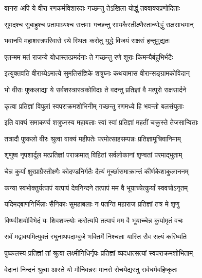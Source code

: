\twolineshloka
{वानरा अपि ये वीरा रणकर्मविशारदाः}
{गच्छन्तु तेऽखिला योद्धुं तववाक्यप्रणोदिताः}%

\twolineshloka
{सुमदश्च सुबाहुश्च प्रतापाग्र्यश्च सत्तमाः}
{गच्छन्तु सायकैस्तीक्ष्णैस्तान्योद्धुं राक्षसाधमान्}%

\twolineshloka
{भवानपि महाशस्त्रपरिवारो रथे स्थितः}
{करोतु युद्धे विजयं राक्षसं हन्तुमुद्यतः}%

\twolineshloka
{एतन्मम मतं राजन्ये योधास्तत्प्रमर्दनाः}
{ते गच्छन्तु रणे शूराः किमन्यैर्बहुभिर्भटैः}%

\twolineshloka
{इत्युक्तवति वीराग्र्येऽमात्ये सुमतिसंज्ञिके}
{शत्रुघ्नः कथयामास वीरान्सङ्ग्रामकोविदान्}%

\twolineshloka
{भो वीराः पुष्कलाद्या ये सर्वशस्त्रास्त्रकोविदाः}
{ते वदन्तु प्रतिज्ञां वै मत्पुरो राक्षसार्दने}%

\twolineshloka
{कृत्वा प्रतिज्ञां विपुलां स्वपराक्रमशोभिनीम्}
{गच्छन्तु रणमध्ये हि भवन्तो बलसंयुताः}%

\twolineshloka
{इति वाक्यं समाकर्ण्य शत्रुघ्नस्य महाबलाः}
{स्वां स्वां प्रतिज्ञां महतीं चक्रुस्ते तेजसान्विताः}%

\twolineshloka
{तत्रादौ पुष्कलो वीरः श्रुत्वा वाक्यं महीपतेः}
{परमोत्साहसम्पन्नः प्रतिज्ञामूचिवानिमाम्}%


\twolineshloka
{शृणुष्व नृपशार्दूल मत्प्रतिज्ञां पराक्रमात्}
{विहितां सर्वलोकानां शृण्वतां परमाद्भुताम्}%

\twolineshloka
{चेन्न कुर्यां क्षुरप्राग्रैस्तीक्ष्णैः कोदण्डनिर्गतैः}
{दैत्यं मूर्च्छासमाक्रान्तं कीर्णकेशाकुलाननम्}%

\twolineshloka
{कन्या स्वभोक्तुर्यत्पापं यत्पापं देवनिन्दने}
{तत्पापं मम वै भूयाच्चेत्कुर्यां स्ववचोऽनृतम्}%

\twolineshloka
{यदिमद्बाणनिर्भिन्नाः सैनिकाः सुमहाबलाः}
{न पतन्ति महाराज प्रतिज्ञां तत्र मे शृणु}%

\twolineshloka
{विष्ण्वीशयोर्विभेदं यः शिवशक्त्योः करोत्यपि}
{तत्पापं मम वै भूयाच्चेन्न कुर्यामृतं वचः}%

\twolineshloka
{सर्वं मद्वाक्यमित्युक्तं रघुनाथपदाम्बुजे}
{भक्तिर्मे निश्चला यास्ति सैव सत्यं करिष्यति}%

\twolineshloka
{पुष्कलस्य प्रतिज्ञां तां श्रुत्वा लक्ष्मीनिधिर्नृपः}
{प्रतिज्ञां व्यदधात्सत्यां स्वपराक्रमशोभिताम्}%


\twolineshloka
{वेदानां निन्दनं श्रुत्वा आस्ते यो मौनिवन्नरः}
{मानसे रोचयेद्यस्तु सर्वधर्मबहिष्कृतः}%

